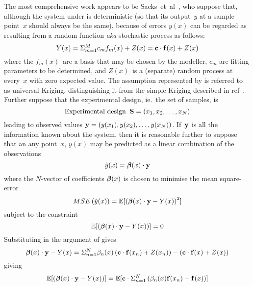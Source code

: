The most comprehensive  work appears to be Sacks~et~al~\cite{Sa89Desi}, who 
suppose that, although the system under is deterministic (so that its output~$y$
at a sample point~$x$ should always be the same), because of errors $y(x)$  can be 
regarded as resulting from a random function \emph{aka} stochastic process
as follows:
\begin{equation}\label{eq:ystoc}
Y(x)= \Sigma^M_{m=1} c_m f_m(x) + Z(x) = {\mathbf c}\cdot {\bf f}(x) + Z(x)
\end{equation}
where the $f_m(x)$~are a basis that may be chosen by the modeller, $c_m$ are
fitting parameters to be determined, and $Z(x)$~is a (separate) random process at every~$x$
with zero expected value. The assumption represented by  is referred to as universal Kriging,
distinguishing it from the simple Kriging described in ref~\cite[\S\,2.3.1]{y2re313}.
Further suppose that the experimental design, ie.\ the set of samples, is
\begin{equation}
\mbox{Experimental design}\;\;{\bf S}=(x_1,x_2,\ldots,x_N)
\end{equation}
leading to observed values ${\bf y}=\left(y(x_1),y(x_2),\ldots,y(x_N)\right)$. If~${\bf y}$
is all the information known about the system, then it is reasonable further to
suppose that an any point~$x$, $y(x)$ may be predicted as a linear combination of
the observations
\begin{equation}
\tilde{y}(x)=\mbox{\boldmath ${\beta}$}(x)\cdot{\bf y} 
\end{equation}
where the $N$-vector of coefficients $\mbox{\boldmath ${\beta}$}(x)$ is chosen to minimise the mean square-error
\begin{equation}\label{eq:mse}
MSE\left(\tilde{y}(x)\right) = \mathbb{E} [ \left( \mbox{\boldmath ${\beta}$}(x)\cdot{\bf y} - Y(x) \right)^2 ]
\end{equation}
subject to the constraint
\begin{equation}\label{eq:nobias}
\mathbb{E} [ \left( \mbox{\boldmath ${\beta}$}(x)\cdot{\bf y} - Y(x) \right) ] = 0
\end{equation}
Substituting  in the argument of  gives
\begin{equation}
\mbox{\boldmath ${\beta}$}(x)\cdot{\bf y} - Y(x)  = \Sigma^N_{n=1} \beta_n(x)\left({\mathbf c}\cdot {\bf f}(x_n) + Z(x_n)\right)
-\left( {\mathbf c}\cdot {\bf f}(x) + Z(x) \right)
\end{equation}
giving
\begin{equation}
\mathbb{E} [ \left( \mbox{\boldmath ${\beta}$}(x)\cdot{\bf y} - Y(x) \right) ] = 
\mathbb{E} [ {\mathbf c}\cdot  \Sigma^N_{n=1}\left(\beta_n(x) {\bf f}(x_n) - {\bf f}(x) \right) ]
\end{equation}
